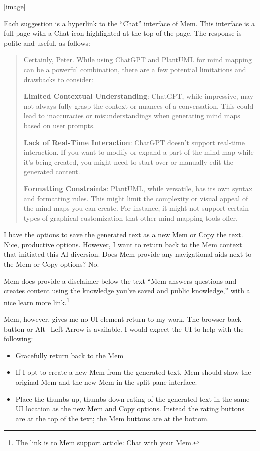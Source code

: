 \documentclass[]{tufte-handout}
\begin{document}
{[}image{]}

Each suggestion is a hyperlink to the ``Chat'' interface of Mem. This
interface is a full page with a Chat icon highlighted at the top of the
page. The response is polite and useful, as follows:

\begin{quote}
Certainly, Peter. While using ChatGPT and PlantUML for mind mapping can
be a powerful combination, there are a few potential limitations and
drawbacks to consider:

\textbf{Limited Contextual Understanding}: ChatGPT, while impressive,
may not always fully grasp the context or nuances of a conversation.
This could lead to inaccuracies or misunderstandings when generating
mind maps based on user prompts.

\textbf{Lack of Real-Time Interaction}: ChatGPT doesn't support
real-time interaction. If you want to modify or expand a part of the
mind map while it's being created, you might need to start over or
manually edit the generated content.

\textbf{Formatting Constraints}: PlantUML, while versatile, has its own
syntax and formatting rules. This might limit the complexity or visual
appeal of the mind maps you can create. For instance, it might not
support certain types of graphical customization that other mind mapping
tools offer.
\end{quote}

I have the options to save the generated text as a new Mem or Copy the
text. Nice, productive options. However, I want to return back to the
Mem context that initiated this AI diversion. Does Mem provide any
navigational aids next to the Mem or Copy options? No.

Mem does provide a disclaimer below the text ``Mem answers questions and
creates content using the knowledge you've saved and public knowledge,''
with a nice learn more link.\footnote{The link is to Mem support
  article:
  \href{https://support.mem.ai/article/102-chat-with-your-mem}{Chat with
  your Mem.}}

Mem, however, gives me no UI element return to my work. The browser back
button or Alt+Left Arrow is available. I would expect the UI to help
with the following:

\begin{itemize}
\item
  Gracefully return back to the Mem
\item
  If I opt to create a new Mem from the generated text, Mem should show
  the original Mem and the new Mem in the split pane interface.
\item
  Place the thumbs-up, thumbs-down rating of the generated text in the
  same UI location as the new Mem and Copy options. Instead the rating
  buttons are at the top of the text; the Mem buttons are at the bottom.
\end{itemize}
\end{document}
